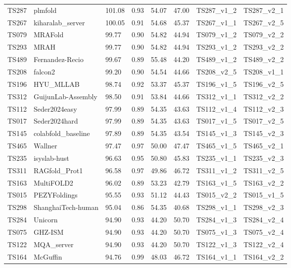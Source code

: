\begin{table}[ht]
{\begin{tabular}{llllllll}
TS287 & plmfold & 101.08 & 0.93 & 54.07 & 47.00 & TS287\_v1\_2 & TS287\_v2\_1 \\ 
TS267 & kiharalab\_server & 100.05 & 0.91 & 54.68 & 45.37 & TS267\_v1\_1 & TS267\_v2\_5 \\ 
TS079 & MRAFold & 99.77 & 0.90 & 54.82 & 44.94 & TS079\_v1\_2 & TS079\_v2\_2 \\ 
TS293 & MRAH & 99.77 & 0.90 & 54.82 & 44.94 & TS293\_v1\_2 & TS293\_v2\_2 \\ 
TS489 & Fernandez-Recio & 99.67 & 0.89 & 55.48 & 44.20 & TS489\_v1\_2 & TS489\_v2\_2 \\ 
TS208 & falcon2 & 99.20 & 0.90 & 54.54 & 44.66 & TS208\_v2\_5 & TS208\_v1\_1 \\ 
TS196 & HYU\_MLLAB & 98.74 & 0.92 & 53.37 & 45.37 & TS196\_v1\_5 & TS196\_v2\_5 \\ 
TS312 & GuijunLab-Assembly & 98.50 & 0.91 & 53.84 & 44.66 & TS312\_v1\_1 & TS312\_v2\_2 \\ 
TS112 & Seder2024easy & 97.99 & 0.89 & 54.35 & 43.63 & TS112\_v1\_4 & TS112\_v2\_3 \\ 
TS017 & Seder2024hard & 97.99 & 0.89 & 54.35 & 43.63 & TS017\_v1\_5 & TS017\_v2\_5 \\ 
TS145 & colabfold\_baseline & 97.89 & 0.89 & 54.35 & 43.54 & TS145\_v1\_3 & TS145\_v2\_3 \\ 
TS465 & Wallner & 97.47 & 0.97 & 50.00 & 47.47 & TS465\_v1\_5 & TS465\_v2\_1 \\ 
TS235 & isyslab-hust & 96.63 & 0.95 & 50.80 & 45.83 & TS235\_v1\_1 & TS235\_v2\_3 \\ 
TS311 & RAGfold\_Prot1 & 96.58 & 0.97 & 49.86 & 46.72 & TS311\_v1\_2 & TS311\_v2\_5 \\ 
TS163 & MultiFOLD2 & 96.02 & 0.89 & 53.23 & 42.79 & TS163\_v1\_5 & TS163\_v2\_2 \\ 
TS015 & PEZYFoldings & 95.55 & 0.93 & 51.12 & 44.43 & TS015\_v2\_2 & TS015\_v1\_5 \\ 
TS298 & ShanghaiTech-human & 95.04 & 0.86 & 54.35 & 40.68 & TS298\_v1\_1 & TS298\_v2\_3 \\ 
TS284 & Unicorn & 94.90 & 0.93 & 44.20 & 50.70 & TS284\_v1\_3 & TS284\_v2\_4 \\ 
TS075 & GHZ-ISM & 94.90 & 0.93 & 44.20 & 50.70 & TS075\_v1\_3 & TS075\_v2\_4 \\ 
TS122 & MQA\_server & 94.90 & 0.93 & 44.20 & 50.70 & TS122\_v1\_3 & TS122\_v2\_4 \\ 
TS164 & McGuffin & 94.76 & 0.99 & 48.03 & 46.72 & TS164\_v1\_1 & TS164\_v2\_2 \\ 

\end{tabular}}
\end{table}
